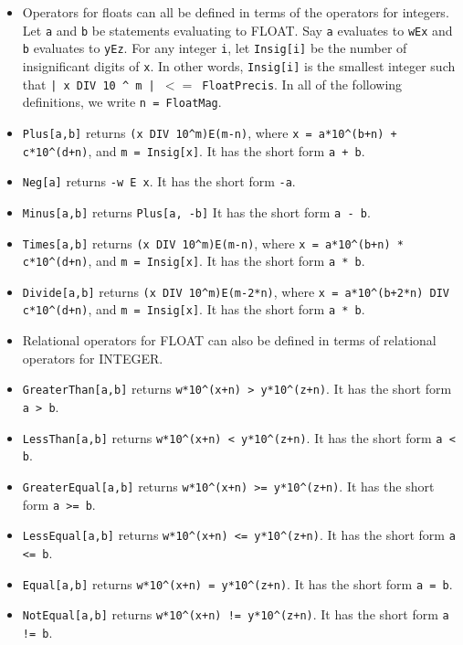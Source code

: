 \begin{itemize}
\item
Operators for floats can all be defined in terms of the operators for
integers.  Let \verb+a+ and \verb+b+ be statements
evaluating to FLOAT. Say \verb+a+ evaluates to \verb+wEx+ and
\verb+b+ evaluates to \verb+yEz+.  For any integer \verb+i+, let 
\verb+Insig[i]+ be the number of insignificant digits of \verb+x+.  In
other words, \verb+Insig[i]+ is the smallest integer such that 
\verb+| x DIV 10 ^ m | +$<=$\verb+ FloatPrecis+.  In all of the following
definitions, we write \verb+n = FloatMag+.

\bd
\item
\verb+Plus[a,b]+ returns \verb&(x DIV 10^m)E(m-n)&, where 
\verb&x = a*10^(b+n) + c*10^(d+n)&, 
and \verb+m = Insig[x]+.  
It has the short form \verb&a + b&.
 
\item
\verb+Neg[a]+ returns \verb+-w E x+.  It has the short form \verb&-a&.  
 
\item
\verb+Minus[a,b]+ returns \verb+Plus[a, -b]+
It has the short form \verb&a - b&.  

\item
\verb+Times[a,b]+ returns \verb&(x DIV 10^m)E(m-n)&, where 
\verb&x = a*10^(b+n) * c*10^(d+n)&, 
and \verb+m = Insig[x]+.  
It has the short form \verb&a * b&.
 
\item
\verb+Divide[a,b]+ returns \verb&(x DIV 10^m)E(m-2*n)&, where 
\verb&x = a*10^(b+2*n) DIV c*10^(d+n)&, 
and \verb+m = Insig[x]+.  
It has the short form \verb&a * b&.
 
\ed
\item
Relational operators for FLOAT can also be defined in terms of
relational operators for INTEGER.  
\bd
\item
\verb+GreaterThan[a,b]+ returns \verb&w*10^(x+n) > y*10^(z+n)&.
It has the short form \verb+a > b+.

\item 
\verb+LessThan[a,b]+ returns \verb&w*10^(x+n) < y*10^(z+n)&.
It has the short form \verb+a < b+.

\item
\verb+GreaterEqual[a,b]+ returns \verb&w*10^(x+n) >= y*10^(z+n)&.
It has the short form \verb+a >= b+.

\item 
\verb+LessEqual[a,b]+ returns \verb&w*10^(x+n) <= y*10^(z+n)&.
It has the short form \verb+a <= b+.

\item 
\verb+Equal[a,b]+ returns \verb&w*10^(x+n) = y*10^(z+n)&.
It has the short form \verb+a = b+.

\item 
\verb+NotEqual[a,b]+ returns \verb&w*10^(x+n) != y*10^(z+n)&.
It has the short form \verb+a != b+.

\ed
\end{itemize}



